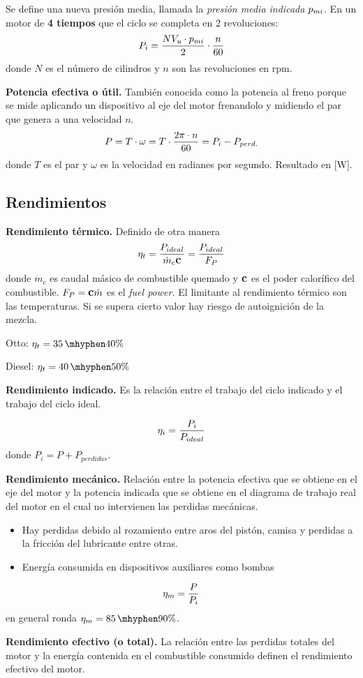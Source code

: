 Se define una nueva presión media, llamada la \textit{presión media indicada} $p_{mi}$. En un motor de \textbf{4 tiempos} que el ciclo se completa en 2 revoluciones:
\[
P_i = \frac{N V_u \cdot p_{mi}}{2}\cdot \frac{n}{60}
\]
donde $N$ es el número de cilindros y $n$ son las revoluciones en rpm.

\textbf{Potencia efectiva o útil.} También conocida como la potencia al freno porque se mide aplicando un dispositivo al eje del motor frenandolo y midiendo el par que genera a una velocidad $n$.
\[
P=T\cdot \omega = T \cdot \frac{2\pi \cdot n}{60}=P_i-P_{perd.}
\]
donde $T$ es el par y $\omega$ es la velocidad en radianes por segundo. Resultado en [W].
\subsection{Rendimientos}
\textbf{Rendimiento térmico.} Definido de otra manera
\[
\eta_t=\frac{P_{ideal}}{\dot{m}_c \mbox{\large$\mathbf{c}$}}=\frac{P_{ideal}}{F_P}
\]
donde $\dot{m}_c$ es caudal másico de combustible quemado y $\mbox{\large$\mathbf{c}$}$ es el poder calorífico del combustible. $F_P=\mbox{\large$\mathbf{c}$} \dot{m}$ es el \emph{fuel power.} El limitante al rendimiento térmico son las temperaturas. Si se supera cierto valor hay riesgo de autoignición de la mezcla.

Otto: $\eta_t=35\,\mhyphen40\%$

Diesel: $\eta_t=40\,\mhyphen50\%$


\textbf{Rendimiento indicado.} Es la relación entre el trabajo del ciclo indicado y el trabajo del ciclo ideal.

\[\eta_i=\frac{P_i}{P_{ideal}}\]
donde $P_i=P+P_{perdidas}$.


\textbf{Rendimiento mecánico.} Relación entre la potencia efectiva que se obtiene en el eje del motor y la potencia indicada que se obtiene en el diagrama de trabajo real del motor en el cual no intervienen las perdidas mecánicas.

\begin{itemize}
    \item Hay perdidas debido al rozamiento entre aros del pistón, camisa y perdidas a la fricción del lubricante entre otras.
    \item Energía consumida en dispositivos auxiliares como bombas
\end{itemize}

\[
\eta_m = \frac{P}{P_i}
\]
en general ronda $\eta_m=85\hyph90\%$.


\textbf{Rendimiento efectivo (o total).} La relación entre las perdidas totales del motor y la energía contenida en el combustible consumido definen el rendimiento efectivo del motor.

